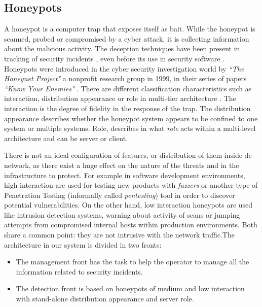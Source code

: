 \documentclass[a4paper]{llncs}
\begin{document}
\subsection{Honeypots}
A honeypot is a computer trap that exposes itself as bait. While the honeypot is scanned, probed or compromised by a cyber attack, it is collecting information about the malicious activity. The deception techniques have been present in tracking of security incidents \cite{Cheswick92anevening}, even before its use in security software \cite{DTK,RoleOfDeception}. Honeypots were introduced in the cyber security investigation world by {\it``The Honeynet Project"} a nonprofit research group in 1999, in their series of papers {\it``Know Your Enemies"} \cite{KnowYourEnemies}. There are different classification characteristics such as interaction, distribution appearance or role in multi-tier architecture \cite{Seifert06taxonomyof}. The interaction is the degree of fidelity in the response of the trap. The distribution appearance describes whether the honeypot system appears to be confined to one system or multiple systems. Role, describes in what {\it role} acts within a multi-level architecture and can be server or client.

There is not an ideal configuration of features, or distribution of them inside de network, as there exist a huge effect on the nature of the threats and in the infrastructure to protect. For example in software development environments, high interaction are used for testing new products with {\it fuzzers} or another type of Penetration Testing (informally called {\it pentesting}) tool \cite{fuzzingforsec} in order to discover potential vulnerabilities. On the other hand, low interaction honeypots are used like intrusion detection systems, warning about activity of scans or jumping attempts from compromised internal hosts within production environments. Both share a common point: they are not intrusive with the network traffic.The architecture in our system is divided in two fronts:
\begin{itemize}
	\item The management front has the task to help the operator to manage all the information related to security incidents.
	\item The detection front is based on honeypots of medium and low interaction with stand-alone distribution appearance and server role.
\end{itemize}
\end{document}
